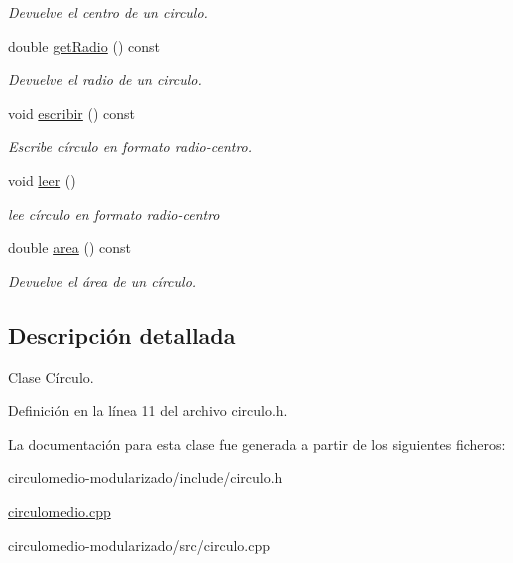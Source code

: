 \begin{DoxyCompactItemize}
\begin{DoxyCompactList}\small\item\em Devuelve el centro de un circulo. \end{DoxyCompactList}\item 
double \hyperlink{classCirculo_a982f8a785d8a68ab1483b609cd752980}{get\+Radio} () const \hypertarget{classCirculo_a982f8a785d8a68ab1483b609cd752980}{}\label{classCirculo_a982f8a785d8a68ab1483b609cd752980}

\begin{DoxyCompactList}\small\item\em Devuelve el radio de un circulo. \end{DoxyCompactList}\item 
void \hyperlink{classCirculo_a2deaed49ea394702beb0554f9480137e}{escribir} () const \hypertarget{classCirculo_a2deaed49ea394702beb0554f9480137e}{}\label{classCirculo_a2deaed49ea394702beb0554f9480137e}

\begin{DoxyCompactList}\small\item\em Escribe círculo en formato radio-\/centro. \end{DoxyCompactList}\item 
void \hyperlink{classCirculo_aa71efffb3b42eeaefd43743a8d34aa74}{leer} ()\hypertarget{classCirculo_aa71efffb3b42eeaefd43743a8d34aa74}{}\label{classCirculo_aa71efffb3b42eeaefd43743a8d34aa74}

\begin{DoxyCompactList}\small\item\em lee círculo en formato radio-\/centro \end{DoxyCompactList}\item 
double \hyperlink{classCirculo_a532d4f2bd03b688403c4370319411dc3}{area} () const \hypertarget{classCirculo_a532d4f2bd03b688403c4370319411dc3}{}\label{classCirculo_a532d4f2bd03b688403c4370319411dc3}

\begin{DoxyCompactList}\small\item\em Devuelve el área de un círculo. \end{DoxyCompactList}\end{DoxyCompactItemize}


\subsection{Descripción detallada}
Clase Círculo. 

Definición en la línea 11 del archivo circulo.\+h.



La documentación para esta clase fue generada a partir de los siguientes ficheros\+:\begin{DoxyCompactItemize}
\item 
circulomedio-\/modularizado/include/circulo.\+h\item 
\hyperlink{circulomedio_8cpp}{circulomedio.\+cpp}\item 
circulomedio-\/modularizado/src/circulo.\+cpp\end{DoxyCompactItemize}
